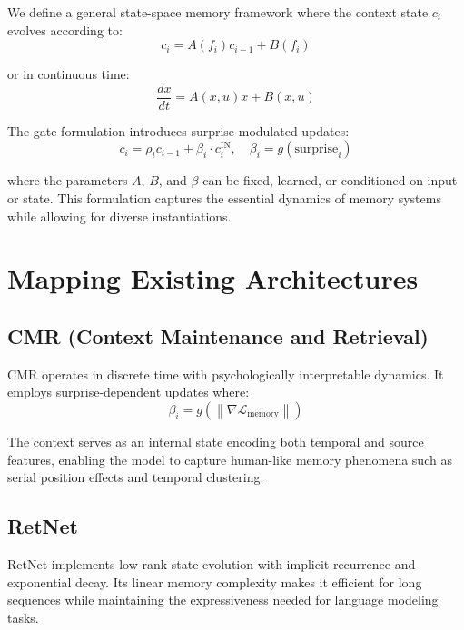 \documentclass[11pt]{article}
\begin{document}
We define a general state-space memory framework where the context state $c_i$ evolves according to:
\begin{equation}
c_{i} = A(f_i) c_{i-1} + B(f_i)
\end{equation}

or in continuous time:
\begin{equation}
\frac{dx}{dt} = A(x, u) x + B(x, u)
\end{equation}

The gate formulation introduces surprise-modulated updates:
\begin{equation}
c_i = \rho_i c_{i-1} + \beta_i \cdot c^{\text{IN}}_i, \quad \beta_i = g(\text{surprise}_i)
\end{equation}

where the parameters $A$, $B$, and $\beta$ can be fixed, learned, or conditioned on input or state. This formulation captures the essential dynamics of memory systems while allowing for diverse instantiations.

\section{Mapping Existing Architectures}

\subsection{CMR (Context Maintenance and Retrieval)}

CMR operates in discrete time with psychologically interpretable dynamics. It employs surprise-dependent updates where:
\begin{equation}
\beta_i = g\left(\left\|\nabla \mathcal{L}_{\text{memory}}\right\|\right)
\end{equation}

The context serves as an internal state encoding both temporal and source features, enabling the model to capture human-like memory phenomena such as serial position effects and temporal clustering.

\subsection{RetNet}

RetNet implements low-rank state evolution with implicit recurrence and exponential decay. Its linear memory complexity makes it efficient for long sequences while maintaining the expressiveness needed for language modeling tasks.
\end{document}
